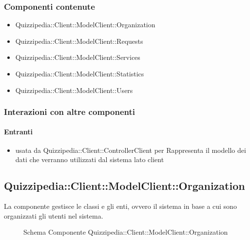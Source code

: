 \subsubsection{Componenti contenute}
\begin{itemize}
\item Quizzipedia::Client::ModelClient::Organization
\item Quizzipedia::Client::ModelClient::Requests
\item Quizzipedia::Client::ModelClient::Services
\item Quizzipedia::Client::ModelClient::Statistics
\item Quizzipedia::Client::ModelClient::Users
\end{itemize}
\subsubsection{Interazioni con altre componenti}
\paragraph{Entranti}
\begin{itemize}
\item usata da Quizzipedia::Client::ControllerClient per Rappresenta il modello dei dati che verranno utilizzati dal sistema lato client
\end{itemize}
\subsection{Quizzipedia::Client::ModelClient::Organization}
La componente gestisce le classi e gli enti, ovvero il sistema in base a cui sono organizzati gli utenti nel sistema.
\begin{figure}[H]
\centering
\noindent{}
\caption[Schema Componente Quizzipedia::Client::ModelClient::Organization]{Schema Componente Quizzipedia::Client::ModelClient::Organization}
\end{figure}
